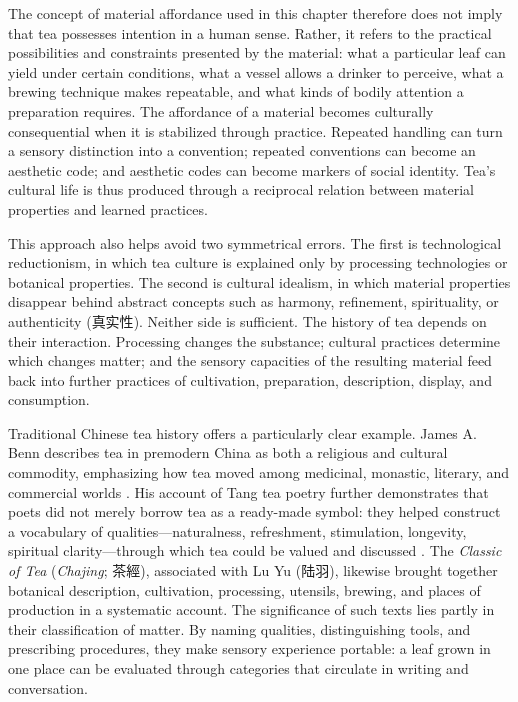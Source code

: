 \documentclass[numbers]{IntechOpen-Book}
\newcommand{\zh}[1]{{\CJKfontspec{Noto Serif CJK SC}\upshape #1}}
\begin{document}
The concept of material affordance used in this chapter therefore does not imply that tea possesses intention in a human sense. Rather, it refers to the practical possibilities and constraints presented by the material: what a particular leaf can yield under certain conditions, what a vessel allows a drinker to perceive, what a brewing technique makes repeatable, and what kinds of bodily attention a preparation requires. The affordance of a material becomes culturally consequential when it is stabilized through practice. Repeated handling can turn a sensory distinction into a convention; repeated conventions can become an aesthetic code; and aesthetic codes can become markers of social identity. Tea's cultural life is thus produced through a reciprocal relation between material properties and learned practices.

This approach also helps avoid two symmetrical errors. The first is technological reductionism, in which tea culture is explained only by processing technologies or botanical properties. The second is cultural idealism, in which material properties disappear behind abstract concepts such as harmony, refinement, spirituality, or authenticity (\zh{真实性}). Neither side is sufficient. The history of tea depends on their interaction. Processing changes the substance; cultural practices determine which changes matter; and the sensory capacities of the resulting material feed back into further practices of cultivation, preparation, description, display, and consumption.

Traditional Chinese tea history offers a particularly clear example. James A. Benn describes tea in premodern China as both a religious and cultural commodity, emphasizing how tea moved among medicinal, monastic, literary, and commercial worlds \cite{benn}. His account of Tang tea poetry further demonstrates that poets did not merely borrow tea as a ready-made symbol: they helped construct a vocabulary of qualities---naturalness, refreshment, stimulation, longevity, spiritual clarity---through which tea could be valued and discussed \cite{bennpoetry}. The \textit{Classic of Tea} (\textit{Chajing}; \zh{茶經}), associated with Lu Yu (\zh{陆羽}), likewise brought together botanical description, cultivation, processing, utensils, brewing, and places of production in a systematic account. The significance of such texts lies partly in their classification of matter. By naming qualities, distinguishing tools, and prescribing procedures, they make sensory experience portable: a leaf grown in one place can be evaluated through categories that circulate in writing and conversation.
\end{document}
